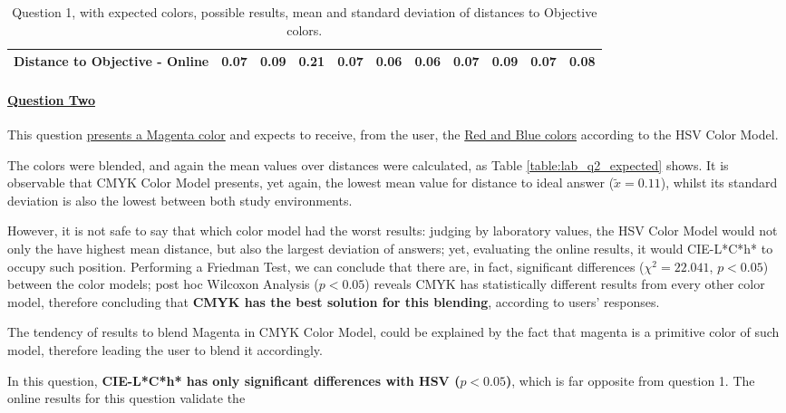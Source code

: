 \begin{table}[H]
{\begin{tabular}{lccccccccccccc}
    \multicolumn{4}{l}{Distance to Objective - Online}                                                                                               & \multicolumn{1}{|c}{0.07}       & \multicolumn{1}{c|}{0.09}    & \multicolumn{1}{|c}{0.21}       & \multicolumn{1}{c|}{0.07}    & \multicolumn{1}{|c}{\textbf{0.06}}       & \multicolumn{1}{c|}{0.06}    & \multicolumn{1}{|c}{0.07}       & \multicolumn{1}{c|}{0.09}    & \multicolumn{1}{|c}{0.07}       & \multicolumn{1}{c|}{0.08}    \\ \hline
    \end{tabular}}
  \caption[Question 1, with expected Results.]{Question 1, with expected colors, possible results, mean and standard deviation of distances to Objective colors.}
  \label{table:lab_q1_expected}
\end{table}
%
\paragraph{\ul{Question Two}}
%
This question \ul{presents a Magenta color} and expects to receive, from the user, the \ul{Red and Blue colors} according to the HSV Color Model. \par
%
The colors were blended, and again the mean values over distances were calculated, as Table \ref{table:lab_q2_expected} shows. It is observable that CMYK Color Model presents, yet again,
the lowest mean value for distance to ideal answer ($\tilde{x} = 0.11$), whilst its standard deviation is also the lowest between both study environments. \par
%
However, it is not safe to say that which color model had the worst results: judging by laboratory values, the HSV Color Model would not only the have highest mean distance, but also
the largest deviation of answers; yet, evaluating the online results, it would CIE-L*C*h* to occupy such position. Performing a Friedman Test, we can conclude that there are, in fact,
significant differences ($\chi^2 = 22.041$, $p < 0.05$) between the color models; post hoc Wilcoxon Analysis ($p < 0.05$) reveals CMYK has statistically different results from every other
color model, therefore concluding that \textbf{CMYK has the best solution for this blending}, according to users' responses. \par
%
The tendency of results to blend Magenta in CMYK Color Model, could be explained by the fact that magenta is a primitive color of such model, therefore leading the user to blend it
accordingly. \par
%
In this question, \textbf{CIE-L*C*h* has only significant differences with HSV ($p < 0.05$)}, which is far opposite from question 1. The online results for this question validate the
